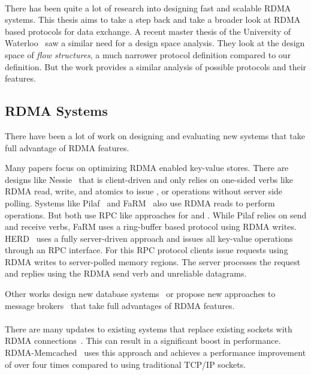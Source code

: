 \paragraph{} There has been quite a lot of research into designing fast and scalable RDMA systems. This thesis aims to take
a step back and take a broader look at RDMA based protocols for data exchange. A recent master thesis of the University of 
Waterloo~\cite{sharma2020design} saw a similar need for a design space analysis. They look at the design space of \emph{flow structures},
a much narrower protocol definition compared to our definition. But the work provides a similar analysis of possible
protocols and their features.


\subsection{RDMA Systems}

There have been a lot of work on designing and evaluating new systems that take full advantage of RDMA features.

Many papers focus on optimizing RDMA enabled key-value stores. There are designs like Nessie~\cite{nessie} that is 
client-driven and only relies on one-sided verbs like RDMA read, write, and atomics to issue , 
or  operations without server side polling.
Systems like Pilaf~\cite{pilaf} and FaRM~\cite{farm} also use RDMA reads to perform  operations. But both use 
RPC like approaches for  and . While Pilaf relies on send and receive verbs, FaRM uses a ring-buffer
based protocol using RDMA writes.
HERD~\cite{herd} uses a fully server-driven approach and issues all key-value operations through an RPC interface. For this
RPC protocol clients issue requests using RDMA writes to server-polled memory regions. The server processes the request and
replies using the RDMA send verb and unreliable datagrams.

Other works design new database systems~\cite{dbrackjoin} or propose new approaches to message brokers~\cite{broker}
that take full advantages of RDMA features. 

\paragraph{} There are many updates to existing systems that replace existing sockets with RDMA 
connections~\cite{memcached, hbase, hdfs}. This can result in a significant boost in performance. RDMA-Memcached~\cite{memcached} 
uses this approach and achieves a performance improvement of over four times compared to using traditional TCP/IP sockets.

